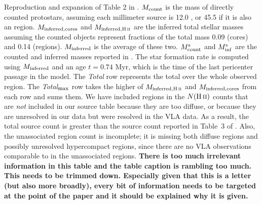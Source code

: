 \begin{table*}[htp]
\begin{minipage}{160mm}
Reproduction and expansion of Table 2 in \citet{Ginsburg2018a}. $M_{\rm count}$ is the mass of directly counted protostars, assuming each millimeter source is 12.0 \msun, or 45.5 \msun if it is also an \hii region.  $M_{\rm inferred,cores}$ and $M_{\rm inferred,\hii}$ are the inferred total stellar masses assuming the counted objects represent fractions of the total mass 0.09 (cores) and 0.14 (\hii regions).  $M_{\rm inferred}$ is the average of these two.  $M_{\rm count}^{\rm s}$ and $M_{\rm inf}^{\rm s}$ are the counted and inferred masses reported in \citet{Schmiedeke2016a}.  The star formation rate is computed using $M_{\rm inferred}$ and an age $t=0.74$ Myr, which is the time of the last pericenter passage in the \citet{Kruijssen2015a} model.  The \emph{Total} row represents the total over the whole observed region.  The \emph{Total}$_{\rm max}$ row takes the higher of $M_{\rm inferred,\hii}$ and $M_{\rm inferred,cores}$ from each row and sums them.  We have included \hii regions in the $N(\hii)$ counts  that are \emph{not} included in our source table \citep[Table~3 of][]{Ginsburg2018a} because they are too diffuse, or because they are unresolved in our data but were resolved in the \citet{De-Pree2014a} VLA data.  As a result, the total source count is greater than the source count reported in Table~3 of \citet{Ginsburg2018a}. Also, the unassociated \hii region count is incomplete; it is missing both diffuse \hii regions and possibly unresolved hypercompact \hii regions, since there are no VLA observations comparable to \citet{De-Pree2014a} in the unassociated regions. {\bf There is too much irrelevant information in this table and the table caption is rambling too much. This needs to be trimmed down. Especially given that this is a letter (but also more broadly), every bit of information needs to be targeted at the point of the paper and it should be explained why it is given.}
\end{minipage}
\end{table*}
